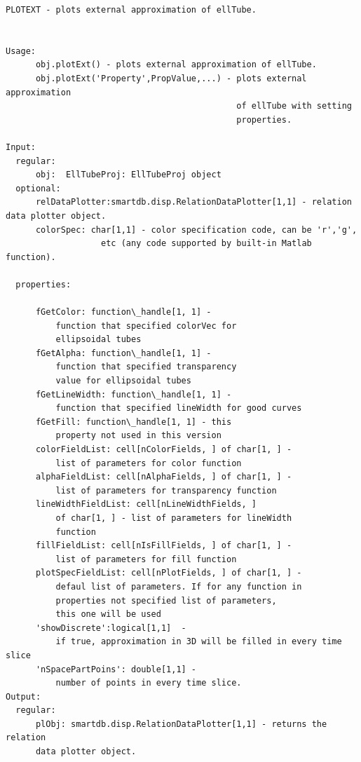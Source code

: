 \documentclass[letterpaper,10pt,english]{sphinxmanual}
\begin{document}
\begin{Verbatim}[commandchars=\\\{\}]
PLOTEXT - plots external approximation of ellTube.


Usage:
      obj.plotExt() - plots external approximation of ellTube.
      obj.plotExt('Property',PropValue,...) - plots external approximation
                                              of ellTube with setting
                                              properties.

Input:
  regular:
      obj:  EllTubeProj: EllTubeProj object
  optional:
      relDataPlotter:smartdb.disp.RelationDataPlotter[1,1] - relation data plotter object.
      colorSpec: char[1,1] - color specification code, can be 'r','g',
                   etc (any code supported by built-in Matlab function).

  properties:

      fGetColor: function\_handle[1, 1] -
          function that specified colorVec for
          ellipsoidal tubes
      fGetAlpha: function\_handle[1, 1] -
          function that specified transparency
          value for ellipsoidal tubes
      fGetLineWidth: function\_handle[1, 1] -
          function that specified lineWidth for good curves
      fGetFill: function\_handle[1, 1] - this
          property not used in this version
      colorFieldList: cell[nColorFields, ] of char[1, ] -
          list of parameters for color function
      alphaFieldList: cell[nAlphaFields, ] of char[1, ] -
          list of parameters for transparency function
      lineWidthFieldList: cell[nLineWidthFields, ]
          of char[1, ] - list of parameters for lineWidth
          function
      fillFieldList: cell[nIsFillFields, ] of char[1, ] -
          list of parameters for fill function
      plotSpecFieldList: cell[nPlotFields, ] of char[1, ] -
          defaul list of parameters. If for any function in
          properties not specified list of parameters,
          this one will be used
      'showDiscrete':logical[1,1]  -
          if true, approximation in 3D will be filled in every time slice
      'nSpacePartPoins': double[1,1] -
          number of points in every time slice.
Output:
  regular:
      plObj: smartdb.disp.RelationDataPlotter[1,1] - returns the relation
      data plotter object.
\end{Verbatim}
\end{document}
